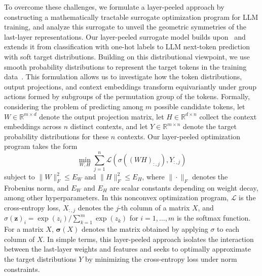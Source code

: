 \documentclass[11pt]{article}
\begin{document}
To overcome these challenges, we formulate a layer-peeled approach by constructing a mathematically tractable surrogate optimization program for LLM training, and analyze this surrogate to unveil the geometric symmetries of the last-layer representations. Our layer-peeled surrogate model builds upon~\citet{fang2021exploring} and extends it from classification with one-hot labels to LLM next-token prediction with soft target distributions. Building on this distributional viewpoint, we use smooth probability distributions to represent the target tokens in the training data~\citep{zhao2024implicit}. This formulation allows us to investigate how the token distributions, output projections, and context embeddings transform equivariantly under group actions formed by subgroups of the permutation group of the tokens. Formally, considering the problem of predicting among $m$ possible candidate tokens, let $W \in \mathbb{R}^{m \times d}$ denote the output projection matrix, let $H \in \mathbb{R}^{d \times n}$ collect the context embeddings across $n$ distinct contexts, and let $Y \in \mathbb{R}^{m \times n}$ denote the target probability distributions for these $n$ contexts. Our layer-peeled optimization program takes the form
\begin{equation}\label{eq:intro}
\min_{W,H}
\sum_{j=1}^n \mathcal L\left(\sigma\left((WH)_{:,j}\right),  Y_{:,j}\right)
\end{equation}
subject to $\|W\|_F^2 \le E_W$ and $\|H\|_F^2 \le E_H$, where $\|\cdot\|_F$ denotes the Frobenius norm, and $E_W$ and $E_H$ are scalar constants depending on weight decay, among other hyperparameters. In this nonconvex optimization program, $\mathcal L$ is the cross-entropy loss, $X_{:,j}$ denotes the $j$-th column of a matrix $X$, and \(\sigma(\boldsymbol z)_i=\exp(z_i)/\sum_{k=1}^{m}\exp(z_k)\) for \(i=1,\dots,m\) is the softmax function. For a matrix \(X\), \(\boldsymbol{\sigma}(X)\) denotes the matrix obtained by applying \(\sigma\) to each column of \(X\). In simple terms, this layer-peeled approach isolates the interaction between the last-layer weights and features and seeks to optimally approximate the target distributions $Y$ by minimizing the cross-entropy loss under norm constraints.
\end{document}
